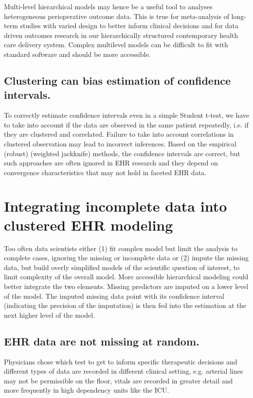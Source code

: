 \documentclass[11pt,notitlepage]{article}
\begin{document}
Multi-level hierarchical models may hence be a useful tool to analyses heterogeneous perioperative outcome data. This is true for meta-analysis of long-term studies with varied design to better inform clinical decisions\cite{AndreaeJohnsonAbstract2013,Spiegelhalter2004bayesian} and for data driven outcomes research  in our hierarchically structured contemporary health care delivery system. Complex multilevel models can be difficult to fit with standard software and should be more accessible.

\subsection*{Clustering can bias estimation of confidence intervals.} To correctly estimate confidence intervals even in a simple Student t-test, we have to take into account if the data are observed in the same patient repeatedly, i.e. if they are clustered and correlated. Failure to take into account correlations in clustered observation may lead to incorrect inferences. Based on the empirical (robust) (weighted jackknife) methods, the confidence intervals are correct, but such approaches are often ignored in EHR research and they depend on convergence characteristics that may not hold in faceted EHR data. 

\section*{Integrating incomplete data into clustered EHR modeling}

Too often data scientists either (1) fit complex model but limit the analysis to complete cases, ignoring the missing or incomplete data or (2) impute the missing data, but build overly simplified models of the scientific question of interest, to limit complexity of the overall model. More accessible hierarchical modeling could better integrate the two elements. Missing predictors are imputed on a lower level of the model. The imputed missing data point with its confidence interval (indicating the precision of the imputation) is then fed into the estimation at the next higher level of the model. 

\subsection*{EHR data are not missing at random.} Physicians chose which test to get to inform specific therapeutic decisions and different types of data are recorded in different clinical setting, e.g. arterial lines may not be permissible on the floor, vitals are recorded in greater detail and more frequently in high dependency units like the ICU. 
\end{document}
